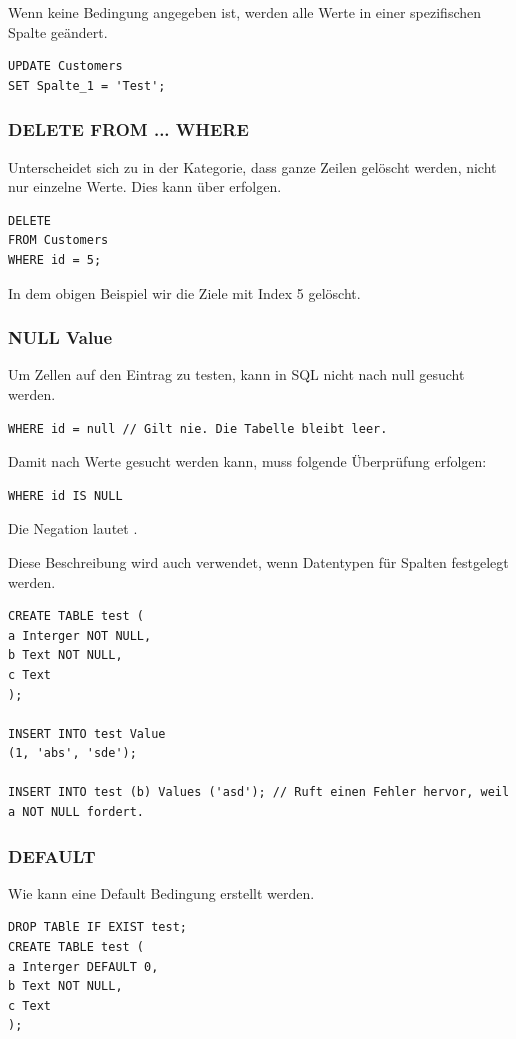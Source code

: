 Wenn keine Bedingung angegeben ist, werden alle Werte in einer spezifischen Spalte geändert.

\begin{lstlisting}[style=SQL]
UPDATE Customers
SET Spalte_1 = 'Test';
\end{lstlisting}

\subsubsection{DELETE FROM ... WHERE}
Unterscheidet sich zu  in der Kategorie, dass ganze Zeilen gelöscht werden, nicht nur einzelne Werte. Dies kann über  erfolgen.

\begin{lstlisting}[style=SQL]
DELETE 
FROM Customers
WHERE id = 5;
\end{lstlisting}

In dem obigen Beispiel wir die Ziele mit Index 5 gelöscht.

\subsubsection{NULL Value} 
Um Zellen auf den Eintrag  zu testen, kann in \gls{SQL} nicht nach null gesucht werden. 

\begin{lstlisting}[style=SQL]
WHERE id = null // Gilt nie. Die Tabelle bleibt leer.
\end{lstlisting}

Damit nach  Werte gesucht werden kann, muss folgende Überprüfung erfolgen:

\begin{lstlisting}[style=SQL]
WHERE id IS NULL
\end{lstlisting}

Die Negation lautet .

Diese Beschreibung wird auch verwendet, wenn Datentypen für Spalten festgelegt werden.


\begin{lstlisting}[style=SQL]
CREATE TABLE test (
a Interger NOT NULL,
b Text NOT NULL,
c Text
);

INSERT INTO test Value 
(1, 'abs', 'sde');

INSERT INTO test (b) Values ('asd'); // Ruft einen Fehler hervor, weil a NOT NULL fordert.
\end{lstlisting}

\subsubsection{DEFAULT}
Wie  kann eine Default Bedingung erstellt werden.
\begin{lstlisting}[style=SQL]
DROP TABlE IF EXIST test;
CREATE TABLE test (
a Interger DEFAULT 0,
b Text NOT NULL,
c Text
);
\end{lstlisting}

